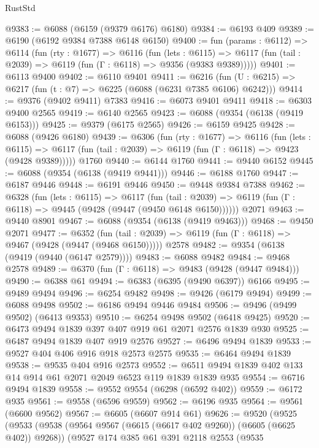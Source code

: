 \begin{lexlean}{RustStd}
\begin{coremodule}
@9383 := @6088 (@6159 (@9379 @6176) @6180)
@9384 := @6193 @409
@9389 := @6190 (@6192 @9384 @7388 @6148 @6150)
@9400 := fun (params : @6112) =>
  @6114
    (fun (rty : @1677) =>
    @6116
      (fun (lets : @6115) =>
      @6117 (fun (tail : @2039) => @6119 (fun (Γ : @6118) => @9356 (@9383 @9389)))))
@9401 := @6113 @9400
@9402 := @6110 @9401
@9411 := @6216 (fun (U : @6215) => @6217 (fun (t : @7) => @6225 (@6088 (@6231 @7385 @6106) @6242)))
@9414 := @9376 (@9402 @9411) @7383
@9416 := @6073 @9401 @9411
@9418 := @6303 @9400 @2565
@9419 := @6140 @2565
@9423 := @6088 (@9354 (@6138 (@9419 @6153)))
@9425 := @9379 (@6175 @2565)
@9426 := @6159 @9425
@9428 := @6088 (@9426 @6180)
@9439 := @6306
    (fun (rty : @1677) =>
    @6116
      (fun (lets : @6115) =>
      @6117 (fun (tail : @2039) => @6119 (fun (Γ : @6118) => @9423 (@9428 @9389)))))
    @1760
@9440 := @6144 @1760
@9441 := @9440 @6152
@9445 := @6088 (@9354 (@6138 (@9419 @9441)))
@9446 := @6188 @1760
@9447 := @6187 @9446
@9448 := @6191 @9446
@9450 := @9448 @9384 @7388
@9462 := @6328
    (fun (lets : @6115) =>
    @6117
      (fun (tail : @2039) => @6119 (fun (Γ : @6118) => @9445 (@9428 (@9447 (@9450 @6148 @6150))))))
    @2071
@9463 := @9440 @8901
@9467 := @6088 (@9354 (@6138 (@9419 @9463)))
@9468 := @9450 @2071
@9477 := @6352
    (fun (tail : @2039) => @6119 (fun (Γ : @6118) => @9467 (@9428 (@9447 (@9468 @6150)))))
    @2578
@9482 := @9354 (@6138 (@9419 (@9440 (@6147 @2579))))
@9483 := @6088 @9482
@9484 := @9468 @2578
@9489 := @6370 (fun (Γ : @6118) => @9483 (@9428 (@9447 @9484)))
@9490 := @6388 @61
@9494 := @6383 (@6395 (@9490 @6397)) @6166
@9495 := @9489 @9494
@9496 := @6254 @9482
@9498 := @9426 (@6179 @9494)
@9499 := @6088 @9498
@9502 := @6186 @9494 @9446 @9484
@9506 := @9496 (@9499 @9502) (@6413 @9353)
@9510 := @6254 @9498 @9502 (@6418 @9425)
@9520 := @6473 @9494 @1839 @397 @407 @919 @61 @2071 @2576 @1839 @930
@9525 := @6487 @9494 @1839 @407 @919 @2576
@9527 := @6496 @9494 @1839
@9533 := @9527 @404 @406 @916 @918 @2573 @2575
@9535 := @6464 @9494 @1839
@9538 := @9535 @404 @916 @2573
@9552 := @6511 @9494 @1839 @402 @133 @14 @914 @61 @2071 @2049 @6523 @119 @1839 @1839 @935
@9554 := @6716 @9494 @1839
@9558 := @9552 @9554 (@6298 (@6592 @402))
@9559 := @6172 @935
@9561 := @9558 (@6596 @9559)
@9562 := @6196 @935
@9564 := @9561 (@6600 @9562)
@9567 := @6605 (@6607 @914 @61)
@9626 := @9520
    (@9525
      (@9533
        (@9538 (@9564 @9567 (@6615 (@6617 @402 @9260)) (@6605 (@6625 @402)) @9268))
        (@9527
          @174
          @385
          @61
          @391
          @2118
          @2553
          (@9535

\end{coremodule}
\end{lexlean}

